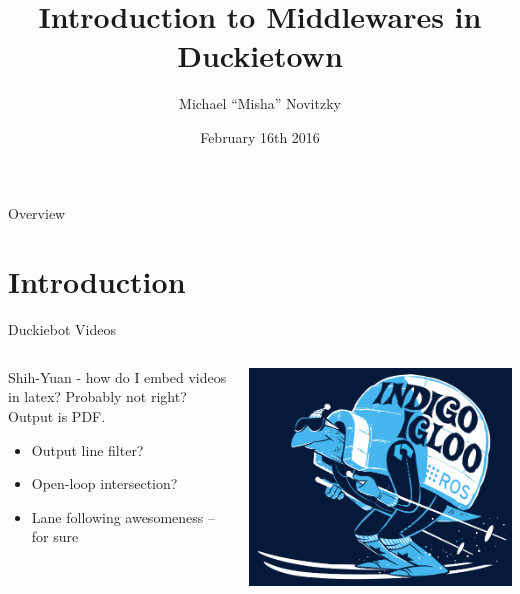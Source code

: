 \documentclass{beamer}
\author[Michael ``Misha'' Novitzky]{Michael ``Misha'' Novitzky}
\title[Introduction to Middlewares in Duckietown]{Introduction to Middlewares in Duckietown}
\institute[Duckietown MIT]{Duckietown, MIT}
\date[Feb. 16th, 2016]{February 16th 2016}
\begin{document}

\begin{frame}[plain,label=titlepage,noframenumbering] %
	\titlepage
\end{frame}

\begin{frame}[label=overview]{Overview}
	\tableofcontents
\end{frame}


\section{Introduction}

\begin{frame}{Duckiebot Videos}
\begin{columns}
	\begin{column}{0.55\textwidth}
		Shih-Yuan - how do I embed \alert{videos} in latex? Probably not right? Output is PDF. 
		\begin{itemize}
			\item Output line filter?
			\item Open-loop intersection?
			\item Lane following awesomeness -- for sure
		\end{itemize}
	\end{column}
	\begin{column}{0.45\textwidth}
		\centering
		\includegraphics[width=\textwidth]{fig/indigoigloo_600.png}
	\end{column}
\end{columns}
\end{frame}
\end{document}
